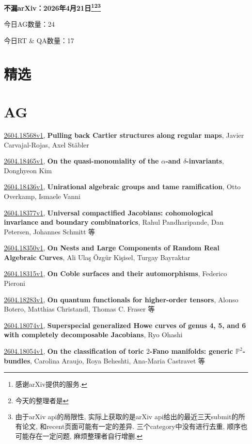 \documentclass[9pt, a4paper]{article}
\theoremstyle{plain}
\theoremstyle{definition}
\theoremstyle{remark}
\newcommand{\arxiv}[3]{\href{https://arxiv.org/abs/#1}{#1}, \textbf{\textcolor{arxivblue}{#2}}, #3}
\newcommand{\AGnumber}{24}
\newcommand{\RTQAnumber}{17}
\newcommand{\NewestDate}{2026年4月21日}
\newcommand{\todayarXiver}{} %
\begin{document}
\begin{center}
    \Huge\textbf{不漏arXiv：\NewestDate\footnote{感谢arXiv提供的服务.}\footnote{今天的整理者是\todayarXiver}\footnote{由于arXiv api的局限性, 实际上获取的是arXiv api给出的最近三天submit的所有论文, 和recent页面可能有一定的差异. 三个category中没有进行去重, 顺序也可能存在一定问题, 麻烦整理者自行增删.}} \\
\end{center}

\setcounter{section}{-1}

\begin{center}
    今日AG数量：\AGnumber
    
    今日RT \& QA数量：\RTQAnumber
    
\end{center}


\section{精选}


\section{AG}
\arxiv{2604.18568v1}{Pulling back Cartier structures along regular maps}{Javier Carvajal-Rojas, Axel Stäbler}

\arxiv{2604.18465v1}{On the quasi-monomiality of the $α$-and $δ$-invariants}{Donghyeon Kim}

\arxiv{2604.18436v1}{Unirational algebraic groups and tame ramification}{Otto Overkamp, Ismaele Vanni}

\arxiv{2604.18377v1}{Universal compactified Jacobians: cohomological invariance and boundary combinatorics}{Rahul Pandharipande, Dan Petersen, Johannes Schmitt 等}

\arxiv{2604.18350v1}{On Nests and Large Components of Random Real Algebraic Curves}{Ali Ulaş Özgür Kişisel, Turgay Bayraktar}

\arxiv{2604.18315v1}{On Coble surfaces and their automorphisms}{Federico Pieroni}

\arxiv{2604.18283v1}{On quantum functionals for higher-order tensors}{Alonso Botero, Matthias Christandl, Thomas C. Fraser 等}

\arxiv{2604.18074v1}{Superspecial generalized Howe curves of genus 4, 5, and 6 with completely decomposable Jacobians}{Ryo Ohashi}

\arxiv{2604.18054v1}{On the classification of toric $2$-Fano manifolds: generic $\mathbb{P}^2$-bundles}{Carolina Araujo, Roya Beheshti, Ana-Maria Castravet 等}
\end{document}
